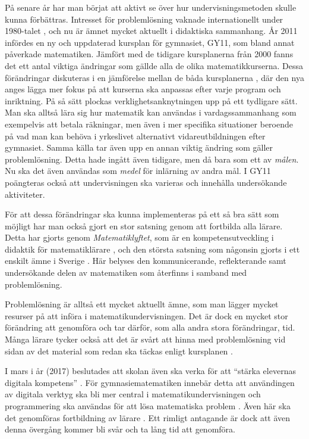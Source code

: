 \textcolor{lila}{På senare år har man börjat att aktivt se över hur undervisningsmetoden skulle kunna förbättras. Intresset för problemlösning vaknade internationellt under 1980-talet \cite{80-talet}, och nu är ämnet mycket aktuellt i didaktiska sammanhang. År 2011 infördes en ny och uppdaterad kursplan för gymnasiet, GY11, som bland annat påverkade matematiken. Jämfört med de tidigare kursplanerna från 2000 fanns det ett antal viktiga ändringar som gällde alla de olika matematikkurserna. 
Dessa förändringar diskuteras i en jämförelse mellan de båda kursplanerna \cite{GY00-GY11}, där den nya anges lägga mer fokus på att kurserna ska anpassas efter varje program och inriktning. På så sätt plockas verklighetsanknytningen upp på ett tydligare sätt. Man ska alltså lära sig hur matematik kan användas i vardagssammanhang som exempelvis att betala räkningar, men även i mer specifika situationer beroende på vad man kan behöva i yrkeslivet alternativt vidareutbildningen efter gymnasiet. 
Samma källa tar även upp en annan viktig ändring som gäller problemlösning. Detta hade ingått även tidigare, men då bara som ett av \textsl{målen}. Nu ska det även användas som \textsl{medel} för inlärning av andra mål. I GY11 poängteras också att undervisningen ska varieras och innehålla undersökande aktiviteter.}

\textcolor{lila}{För att dessa förändringar ska kunna implementeras på ett så bra sätt som möjligt har man också gjort en stor satsning genom att fortbilda alla lärare. Detta har gjorts genom \textsl{Matematiklyftet}, som är en kompetensutveckling i didaktik för matematiklärare \cite{Namnaren}, och den största satsning som någonsin gjorts i ett enskilt ämne i Sverige \cite{mattelyftet}. Här belyses den kommunicerande, reflekterande samt undersökande delen av matematiken som återfinns i samband med problemlösning.}
            
\textcolor{lila}{Problemlösning är alltså ett mycket aktuellt ämne, som man lägger mycket resurser på att införa i matematikundervisningen. Det är dock en mycket stor förändring att genomföra och tar därför, som alla andra stora förändringar, tid. Många lärare tycker också att det är svårt att hinna med problemlösning vid sidan av det material som redan ska täckas enligt kursplanen \cite{2016Senare}.}


\textcolor{lila}{I mars i år (2017) beslutades att skolan även ska verka för att ``stärka elevernas digitala kompetens'' \cite{regeringen}. För gymnasiematematiken innebär detta att användingen av digitala verktyg ska bli mer central i matematikundervisningen och programmering ska användas för att lösa matematiska problem \cite{itiskolan}. Även här ska det genomföras fortbildning av lärare \cite{prog_utbildning}. Ett rimligt antagande är dock att även denna övergång kommer bli svår och ta lång tid att genomföra.}